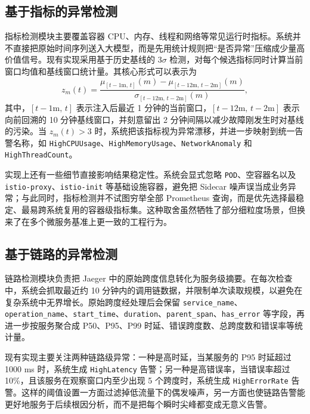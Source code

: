 \subsection{基于指标的异常检测}

指标检测模块主要覆盖容器 CPU、内存、线程和网络等常见运行时指标。系统并不直接把原始时间序列送入大模型，而是先用统计规则把“是否异常”压缩成少量高价值信号。现有实现采用基于历史基线的 $3\sigma$ 检测，对每个候选指标同时计算当前窗口均值和基线窗口统计量。其核心形式可以表示为
\begin{equation}
    \label{eq:zscore-metric}
    z_m(t)=\frac{\mu_{[t-1\text{m},\,t]}(m)-\mu_{[t-12\text{m},\,t-2\text{m}]}(m)}{\sigma_{[t-12\text{m},\,t-2\text{m}]}(m)},
\end{equation}
其中，$[t-1\text{m},\,t]$ 表示注入后最近 1 分钟的当前窗口，$[t-12\text{m},\,t-2\text{m}]$ 表示向前回溯的 10 分钟基线窗口，并刻意留出 2 分钟间隔以减少故障刚发生时对基线的污染。当 $z_m(t) > 3$ 时，系统把该指标视为异常漂移，并进一步映射到统一告警名称，如 \texttt{HighCPUUsage}、\texttt{HighMemoryUsage}、\texttt{NetworkAnomaly} 和 \texttt{HighThreadCount}。

实现上还有一些细节直接影响结果稳定性。系统会显式忽略 \texttt{POD}、空容器名以及 \texttt{istio-proxy}、\texttt{istio-init} 等基础设施容器，避免把 Sidecar 噪声误当成业务异常；与此同时，指标检测并不试图穷举全部 Prometheus 查询，而是优先选择最稳定、最易跨系统复用的容器级指标集。这种取舍虽然牺牲了部分细粒度场景，但换来了在多个微服务基准上更一致的工程行为。

\subsection{基于链路的异常检测}

链路检测模块负责把 Jaeger 中的原始跨度信息转化为服务级摘要。在每次检查中，系统会抓取最近约 10 分钟内的调用链数据，并限制单次读取规模，以避免在复杂系统中无界增长。原始跨度经处理后会保留 \texttt{service\_name}、\texttt{operation\_name}、\texttt{start\_time}、\texttt{duration}、\texttt{parent\_span}、\texttt{has\_error} 等字段，再进一步按服务聚合成 P50、P95、P99 时延、错误跨度数、总跨度数和错误率等统计量。

现有实现主要关注两种链路级异常：一种是高时延，当某服务的 P95 时延超过 1000 ms 时，系统生成 \texttt{HighLatency} 告警；另一种是高错误率，当错误率超过 10\%，且该服务在观察窗口内至少出现 5 个跨度时，系统生成 \texttt{HighErrorRate} 告警。这样的阈值设置一方面过滤掉低流量下的偶发噪声，另一方面也使链路告警能更好地服务于后续根因分析，而不是把每个瞬时尖峰都变成无意义告警。

